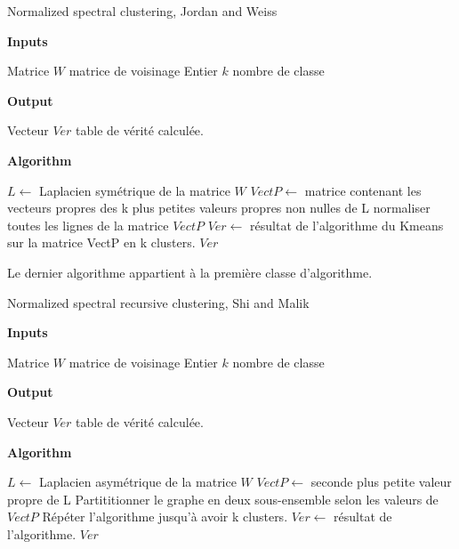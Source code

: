 \begin{algorithm}[H]
  \caption{Normalized spectral clustering, Jordan and Weiss }
  
  \textbf{Inputs}%
  \begin{algorithmic}[1]
    \STATE Matrice $W$ matrice de voisinage
    \STATE Entier $k$ nombre de classe
  \end{algorithmic}
  \bigskip

  \textbf{Output}%
  \begin{algorithmic}[1]
    \STATE Vecteur $Ver$ table de vérité calculée.
  \end{algorithmic}
  \bigskip
  
  \textbf{Algorithm}
  \begin{algorithmic}[1]
		\STATE $L\gets$ Laplacien symétrique de la matrice $W$
     	\STATE $VectP\gets$ matrice contenant les vecteurs propres des k plus petites valeurs propres non nulles de L
     	\STATE normaliser toutes les lignes de la matrice $VectP$
     	\STATE $Ver\gets$ résultat de l'algorithme du Kmeans sur la matrice VectP en k clusters.	
  \RETURN $Ver$
  \end{algorithmic}
\end{algorithm}

\medskip

Le dernier algorithme appartient à la première classe d'algorithme.

\medskip

\begin{algorithm}[H]
  \caption{Normalized spectral recursive clustering, Shi and Malik }
  
  \textbf{Inputs}%
  \begin{algorithmic}[1]
    \STATE Matrice $W$ matrice de voisinage
    \STATE Entier $k$ nombre de classe
  \end{algorithmic}
  \bigskip

  \textbf{Output}%
  \begin{algorithmic}[1]
    \STATE Vecteur $Ver$ table de vérité calculée.
  \end{algorithmic}
  \bigskip
  
  \textbf{Algorithm}
  \begin{algorithmic}[1]
		\STATE $L\gets$ Laplacien asymétrique de la matrice $W$
     	\STATE $VectP\gets$ seconde plus petite valeur propre de L
     	\STATE Partititionner le graphe en deux sous-ensemble selon les valeurs de $VectP$
     	\STATE Répéter l'algorithme jusqu'à avoir k clusters.
     	\STATE $Ver\gets$ résultat de l'algorithme.	
  \RETURN $Ver$
  \end{algorithmic}
\end{algorithm}


